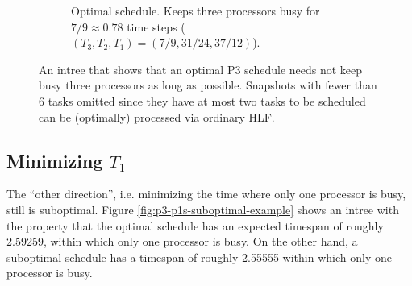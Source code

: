 \begin{figure}[ht]
\begin{subfigure}{.45\linewidth}
    \caption{Optimal schedule. Keeps three processors busy for $7/9\approx 0.78$ time steps ($(T_3, T_2, T_1)=(7/9, 31/24, 37/12)$).}
  \end{subfigure}
  \caption{An intree that shows that an optimal P3 schedule needs not keep busy three processors as long as possible. Snapshots with fewer than 6 tasks omitted since they have at most two tasks to be scheduled can be (optimally) processed via ordinary HLF.}
  \label{fig:p3-p3l-suboptimal-example}
\end{figure}

\subsection{Minimizing $T_1$}
\label{sec:p3-disproving-short-p1}

The ``other direction'', i.e. minimizing the time where only one processor is busy, still is suboptimal.
Figure \ref{fig:p3-p1s-suboptimal-example} shows an intree with the property that the optimal schedule has an expected timespan of roughly 2.59259, within which only one processor is busy. On the other hand, a suboptimal schedule has a timespan of roughly 2.55555 within which only one processor is busy.

